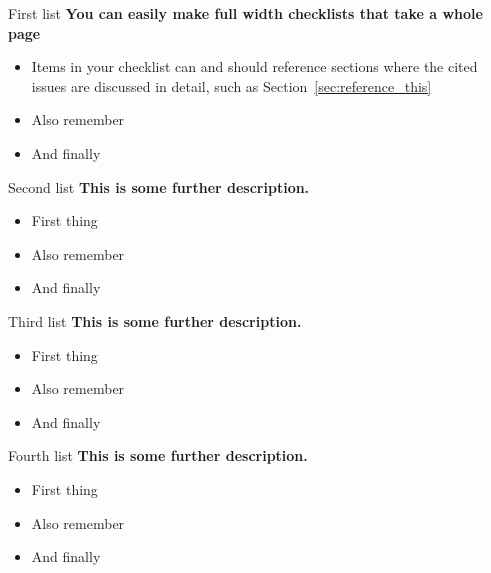 \documentclass[9pt,bestpractices]{livecoms}
\begin{document}
\begin{Checklists*}[p!]

\begin{checklist}{First list}
\textbf{You can easily make full width checklists that take a whole page}
\begin{itemize}
\item Items in your checklist can and should reference sections where the cited issues are discussed in detail, such as Section~\ref{sec:reference_this}
\item Also remember
\item And finally
\end{itemize}
\end{checklist}

\begin{checklist}{Second list}
\textbf{This is some further description.}
\begin{itemize}
\item First thing
\item Also remember
\item And finally
\end{itemize}
\end{checklist}

\begin{checklist}{Third list}
\textbf{This is some further description.}
\begin{itemize}
\item First thing
\item Also remember
\item And finally
\end{itemize}
\end{checklist}

\begin{checklist}{Fourth list}
\textbf{This is some further description.}
\begin{itemize}
\item First thing
\item Also remember
\item And finally
\end{itemize}
\end{checklist}

\end{Checklists*}
\end{document}
